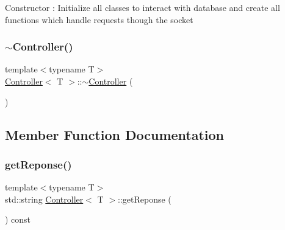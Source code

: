 Constructor \+: Initialize all classes to interact with database and create all functions which handle requests though the socket \mbox{\label{classController_a72f857e60642c44e868c6438089054a5}} 
\subsubsection{\texorpdfstring{$\sim$\+Controller()}{~Controller()}}
{\footnotesize\ttfamily template$<$typename T$>$ \\
\hyperlink{classController}{Controller}$<$ T $>$\+::$\sim$\hyperlink{classController}{Controller} (\begin{DoxyParamCaption}{ }\end{DoxyParamCaption})\hspace{0.3cm}{\ttfamily [inline]}}



\subsection{Member Function Documentation}
\mbox{\label{classController_ab5985438cd9815c569dfd60a7ef77e40}} 
\subsubsection{\texorpdfstring{get\+Reponse()}{getReponse()}}
{\footnotesize\ttfamily template$<$typename T$>$ \\
std\+::string \hyperlink{classController}{Controller}$<$ T $>$\+::get\+Reponse (\begin{DoxyParamCaption}{ }\end{DoxyParamCaption}) const\hspace{0.3cm}{\ttfamily [inline]}}

\mbox{\label{classController_a0c853a94aa63fdfee093dfab9d0e71c1}} 
